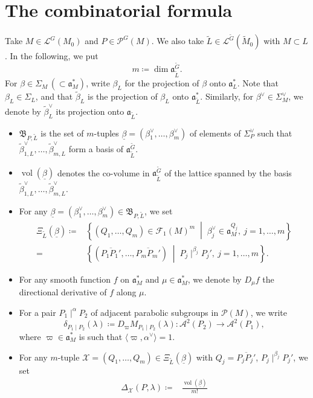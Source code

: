\documentclass[12pt]{amsart}
\theoremstyle{definition}
\theoremstyle{plain}
\theoremstyle{remark}
\DeclareMathOperator{\vol}{vol}%
\newcommand{\fa}{\mathfrak{a}}
\newcommand{\fB}{\mathfrak{B}}
\newcommand{\cA}{\mathcal{A}}
\newcommand{\cF}{\mathcal{F}}
\newcommand{\cL}{\mathcal{L}}
\newcommand{\cP}{\mathcal{P}}
\newcommand{\cX}{\mathcal{X}}
\numberwithin{equation}{section}
\newcommand{\tG}{\widetilde{G}}
\newcommand{\tM}{\widetilde{M}}
\newcommand{\tL}{\widetilde{L}}
\newcommand{\tbeta}{\widetilde{\beta}}
\begin{document}
\section{The combinatorial formula}\label{sec:combiatorial}

Take $M\in\cL^G(M_0)$ and $P\in\cP^G(M)$.
We also take $\tL\in\cL^{\tG}(\tM_0)$ with $M\subset L$. 
In the following, we put
\[
m\coloneqq \dim \fa_{\tL}^{\tG}.
\]
For $\beta\in\Sigma_M\, (\subset \fa_M^*)$, write $\beta_L$ for the projection of $\beta$ onto $\fa_L^*$. 
Note that $\beta_L\in\Sigma_L$, and that $\tbeta_L$ is the projection of $\beta_L$ onto $\fa_{\tL}^*$. 
Similarly, for $\beta^\vee\in \Sigma_M^\vee$, we denote by $\tbeta^\vee_L$ its projection onto $\fa_{\tL}$.
\begin{itemize}
    \item $\fB_{P,\tL}$ is the set of $m$-tuples $\underline{\beta}=(\beta_1^\vee,\ldots,\beta_m^\vee)$ of elements of $\Sigma_P^\vee$ such that $\tbeta_{1,L}^\vee,\dots,\tbeta_{m,L}^\vee$ form a basis of $\fa_{\tL}^{\tG}$.
\item $\vol(\underline{\beta})$ denotes the co-volume in $\fa_{\tL}^{\tG}$ of the lattice spanned by the basis $\tbeta_{1,L}^\vee,\dots,\tbeta_{m,L}^\vee$.
\item For any $\underline{\beta}=(\beta_1^\vee,\ldots,\beta_m^\vee)\in \fB_{P,\tL}$, we set
\begin{align*}
\Xi_{\tL}(\underline{\beta})
\coloneqq &
\left\{
(Q_1,\ldots,Q_m)\in \cF_1(M)^m \;\middle|\;
\beta_j^\vee\in \fa_M^{Q_j},
\ j=1,\ldots,m
\right\} \\
=& 
\left\{
(\overline{P_1P_1'},\ldots,\overline{P_mP_m'})
\;\middle|\;
P_j\mid^{\beta_j}P_j',
\ j=1,\ldots,m
\right\}.
\end{align*}
\item  For any smooth function $f$ on $\fa_M^*$ and $\mu\in \fa_M^*$, we denote by $D_\mu f$ the directional derivative of $f$ along $\mu$. 
\item For a pair $P_1\mid^\alpha P_2$ of adjacent parabolic subgroups in $\cP(M)$, we write
\[
\delta_{P_1\mid P_2}(\lambda)\coloneqq D_\varpi M_{P_1\mid P_2}(\lambda)
\colon
\cA^2(P_2)\to \cA^2(P_1),
\]
where $\varpi\in \fa_M^*$ is such that $\langle \varpi,\alpha^\vee\rangle=1$.
\item For any $m$-tuple $\cX=(Q_1,\dots,Q_m)\in\Xi_{\tL}(\underline{\beta})$ with $Q_j=\overline{P_jP_j'}$, $P_j\mid^{\beta_j}P_j'$,
we set
\begin{align*}
\Delta_{\cX}(P,\lambda)\coloneqq&    \frac{\vol(\underline{\beta})}{m!}

\end{align*}
\end{itemize}
\end{document}
